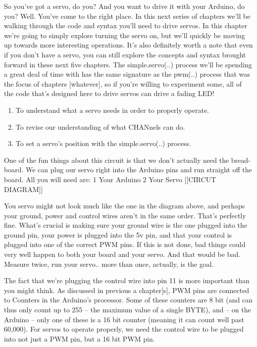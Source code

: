 	So you've got a servo, do you? And you want to drive it with your Arduino, do you? Well. You've come to the right place. In this next series of chapters we'll be walking through the code and syntax you'll need to drive servos. In this chapter we're going to simply explore turning the servo on, but we'll quickly be moving up towards more interesting operations.
	It's also definitely worth a note that even if you don't have a servo, you can still explore the concepts and syntax brought forward in these next five chapters. The simple.servo(..) process we'll be spending a great deal of time with has the same signature as the pwm(..) process that was the focus of chapters [whatever], so if you're willing to experiment some, all of the code that's designed here to drive servos can drive a fading LED!

\GOALS

\begin{enumerate}
  \item To understand what a servo needs in order to properly operate.
	\item To revise our understanding of what CHANnels can do.
	\item To set a servo's position with the simple.servo(..) process.
\end{enumerate}


\CIRCUIT
	One of the fun things about this circuit is that we don't actually need the bread-board. We can plug our servo right into the Arduino pins and run straight off the board.
	All you will need are:
	1 Your Arduino
	2 Your Servo
		[[CIRCUT DIAGRAM]]

	You servo might not look much like the one in the diagram above, and perhaps your ground, power and control wires aren't in the same order. That's perfectly fine. What's crucial is making sure your ground wire is the one plugged into the ground pin, your power is plugged into the 5v pin, and that your control is plugged into one of the correct PWM pins. If this is not done, bad things could very well happen to both your board and your servo. And that would be bad.
	Measure twice, run your servo.. more than once, actually, is the goal.

	The fact that we're plugging the control wire into pin 11 is more important than you might think. As discussed in previous a chapter[s], PWM pins are connected to Counters in the Arduino's processor. Some of these counters are 8 bit (and can thus only count up to 255 -- the maximum value of a single BYTE), and -- on the Arduino -- only one of these is a 16 bit counter (meaning it can count well past 60,000). For servos to operate properly, we need the control wire to be plugged into not just a PWM pin, but a 16 bit PWM pin.

